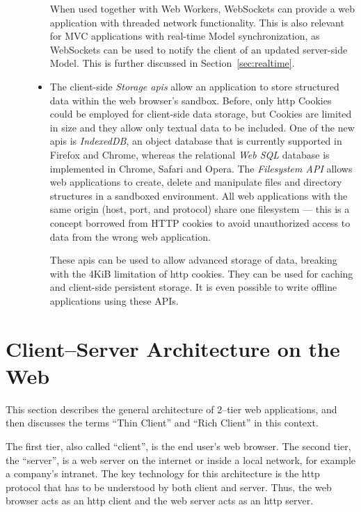 \begin{description}
\begin{itemize}
		When used together with Web Workers, WebSockets can provide a web application with threaded network functionality. This is also relevant for MVC applications with real-time Model synchronization, as WebSockets can be used to notify the client of an updated server-side Model. This is further discussed in Section~\ref{sec:realtime}.

		\item The client-side \emph{Storage \glspl{api}} allow an application to store structured data within the web browser's sandbox. Before, only \gls{http} Cookies could be employed for client-side data storage, but Cookies are limited in size and they allow only textual data to be included. One of the new \glspl{api} is \emph{IndexedDB}, an object database that is currently supported in Firefox and Chrome, whereas the relational \emph{Web SQL} database is implemented in Chrome, Safari and Opera. The \emph{Filesystem API} allows web applications to create, delete and manipulate files and directory structures in a sandboxed environment. All web applications with the same origin (host, port, and protocol) share one filesystem --- this is a concept borrowed from HTTP cookies to avoid unauthorized access to data from the wrong web application.~\cite[pp. 700--712]{flanagan}

		These \glspl{api} can be used to allow advanced storage of data, breaking with the 4KiB limitation of \ac{http} cookies. They can be used for caching and client-side persistent storage. It is even possible to write offline applications using these APIs.
	\end{itemize}
\end{description}

\section{Client--Server Architecture on the Web}
\label{sec:clientserver}
This section describes the general architecture of 2--tier web applications, and then discusses the terms ``Thin Client'' and ``Rich Client'' in this context.

The first tier, also called ``client'', is the end user's web browser. The second tier, the ``server'', is a web server on the internet or inside a local network, for example a company's intranet. The key technology for this architecture is the \acs{http} protocol that has to be understood by both client and server. Thus, the web browser acts as an \acs{http} client and the web server acts as an \acs{http} server.

